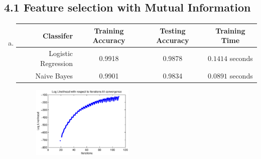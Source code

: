 \documentclass[11pt]{article}
\begin{document}
\subsection*{4.1 Feature selection with Mutual Information}
\begin{enumerate}[a.]
\item

\begin{tabular}{|r|c|c|c|}
  \hline
  Classifer             & Training Accuracy & Testing Accuracy & Training Time      \\
  \hline
  Logistic Regression   & 0.9918            & 0.9878           &  $0.1414$ seconds  \\
  \hline
  Naive Bayes           & 0.9901            & 0.9834           &  $0.0891$ seconds  \\
  \hline
\end{tabular}

\begin{figure}[h]
\begin{center}
\includegraphics[width=0.46\textwidth]{4}
\end{center}
\label{fig:1}
\end{figure}
\end{enumerate}
\end{document}
